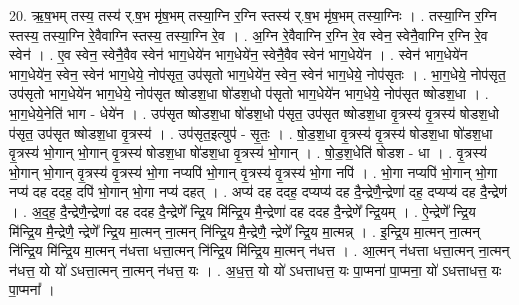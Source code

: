 \documentclass[17pt]{extarticle}
\begin{document}
20. ऋ॒ष॒भम् तस्य॒ तस्य॑ र्.ष॒भ मृ॑ष॒भम् तस्या॒ग्नि र॒ग्नि स्तस्य॑ र्.ष॒भ मृ॑ष॒भम् तस्या॒ग्निः । . तस्या॒ग्नि र॒ग्नि स्तस्य॒ तस्या॒ग्नि रे॒वैवाग्नि स्तस्य॒ तस्या॒ग्नि रे॒व । . अ॒ग्नि रे॒वैवाग्नि र॒ग्नि रे॒व स्वेन॒ स्वेनै॒वाग्नि र॒ग्नि रे॒व स्वेन॑ । . ए॒व स्वेन॒ स्वेनै॒वैव स्वेन॑ भाग॒धेये॑न भाग॒धेये॑न॒ स्वेनै॒वैव स्वेन॑ भाग॒धेये॑न । . स्वेन॑ भाग॒धेये॑न भाग॒धेये॑न॒ स्वेन॒ स्वेन॑ भाग॒धेये॒ नोप॑सृत॒ उप॑सृतो भाग॒धेये॑न॒ स्वेन॒ स्वेन॑ भाग॒धेये॒ नोप॑सृतः । . भा॒ग॒धेये॒ नोप॑सृत॒ उप॑सृतो भाग॒धेये॑न भाग॒धेये॒ नोप॑सृत ष्षोडश॒धा षो॑डश॒धो प॑सृतो भाग॒धेये॑न भाग॒धेये॒ नोप॑सृत ष्षोडश॒धा । . भा॒ग॒धेये॒नेति॑ भाग - धेये॑न । . उप॑सृत ष्षोडश॒धा षो॑डश॒धो प॑सृत॒ उप॑सृत ष्षोडश॒धा वृ॒त्रस्य॑ वृ॒त्रस्य॑ षोडश॒धो प॑सृत॒ उप॑सृत ष्षोडश॒धा वृ॒त्रस्य॑ । . उप॑सृत॒इत्युप॑ - सृ॒तः॒ । . षो॒ड॒श॒धा वृ॒त्रस्य॑ वृ॒त्रस्य॑ षोडश॒धा षो॑डश॒धा वृ॒त्रस्य॑ भो॒गान् भो॒गान् वृ॒त्रस्य॑ षोडश॒धा षो॑डश॒धा वृ॒त्रस्य॑ भो॒गान् । . षो॒ड॒श॒धेति॑ षोडश - धा । . वृ॒त्रस्य॑ भो॒गान् भो॒गान् वृ॒त्रस्य॑ वृ॒त्रस्य॑ भो॒गा नप्यपि॑ भो॒गान् वृ॒त्रस्य॑ वृ॒त्रस्य॑ भो॒गा नपि॑ । . भो॒गा नप्यपि॑ भो॒गान् भो॒गा नप्य॑ दह ददह॒ दपि॑ भो॒गान् भो॒गा नप्य॑ दहत् । . अप्य॑ दह ददह॒ दप्यप्य॑ दह दै॒न्द्रेणै॒न्द्रेणा॑ दह॒ दप्यप्य॑ दह दै॒न्द्रेण॑ । . अ॒द॒ह॒ दै॒न्द्रेणै॒न्द्रेणा॑ दह ददह दै॒न्द्रेणे᳚ न्द्रि॒य मि॑न्द्रि॒य मै॒न्द्रेणा॑ दह ददह दै॒न्द्रेणे᳚ न्द्रि॒यम् । . ऐ॒न्द्रेणे᳚ न्द्रि॒य मि॑न्द्रि॒य मै॒न्द्रेणै॒ न्द्रेणे᳚ न्द्रि॒य मा॒त्मन् ना॒त्मन् नि॑न्द्रि॒य मै॒न्द्रेणै॒ न्द्रेणे᳚ न्द्रि॒य मा॒त्मन्न् । . इ॒न्द्रि॒य मा॒त्मन् ना॒त्मन् नि॑न्द्रि॒य मि॑न्द्रि॒य मा॒त्मन् न॑धत्ता धत्ता॒त्मन् नि॑न्द्रि॒य मि॑न्द्रि॒य मा॒त्मन् न॑धत्त । . आ॒त्मन् न॑धत्ता धत्ता॒त्मन् ना॒त्मन् न॑धत्त॒ यो यो॑ ऽधत्ता॒त्मन् ना॒त्मन् न॑धत्त॒ यः । . अ॒ध॒त्त॒ यो यो॑ ऽधत्ताधत्त॒ यः पा॒प्मना॑ पा॒प्मना॒ यो॑ ऽधत्ताधत्त॒ यः पा॒प्मना᳚ । \newline
\end{document}
